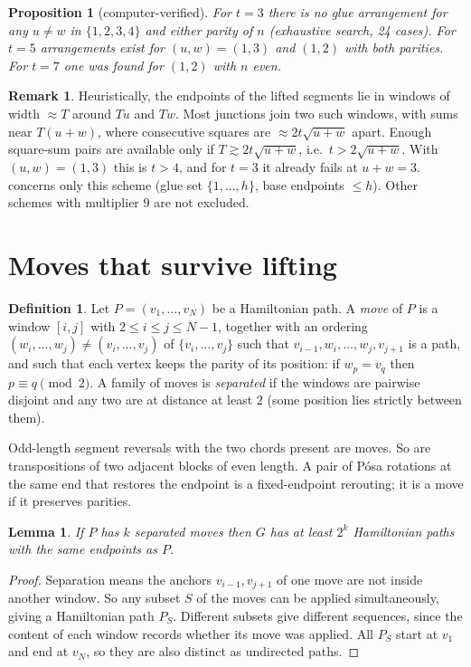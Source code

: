 \documentclass[11pt]{amsart}
\newtheorem{lemma}[theorem]{Lemma}
\newtheorem{proposition}[theorem]{Proposition}
\theoremstyle{definition}
\newtheorem{definition}[theorem]{Definition}
\newtheorem{remark}[theorem]{Remark}
\begin{document}
\begin{proposition}[computer-verified]\label{prop:t3}
For $t=3$ there is no glue arrangement for any $u\ne w$ in $\{1,2,3,4\}$ and either
parity of $n$ (exhaustive search, 24 cases). For $t=5$ arrangements exist for
$(u,w)=(1,3)$ and $(1,2)$ with both parities. For $t=7$ one was found for $(1,2)$
with $n$ even.
\end{proposition}

\begin{remark}\label{rem:threshold}
Heuristically, the endpoints of the lifted segments lie in windows of width $\approx T$
around $Tu$ and $Tw$. Most junctions join two such windows, with sums near $T(u+w)$, where
consecutive squares are $\approx 2t\sqrt{u+w}$ apart. Enough square-sum pairs are
available only if $T\gtrsim 2t\sqrt{u+w}$, i.e.\ $t>2\sqrt{u+w}$. With $(u,w)=(1,3)$ this
is $t>4$, and for $t=3$ it already fails at $u+w=3$.  concerns only this
scheme (glue set $\{1,\dots,h\}$, base endpoints $\le h$). Other schemes with
multiplier $9$ are not excluded.
\end{remark}

\section{Moves that survive lifting}\label{sec:moves}

\begin{definition}\label{def:move}
Let $P=(v_1,\dots,v_N)$ be a Hamiltonian path. A \emph{move} of $P$ is a window
$[i,j]$ with $2\le i\le j\le N-1$, together with an ordering
$(w_i,\dots,w_j)\ne(v_i,\dots,v_j)$ of $\{v_i,\dots,v_j\}$ such that
$v_{i-1},w_i,\dots,w_j,v_{j+1}$ is a path, and such that each vertex keeps the
parity of its position: if $w_p=v_q$ then $p\equiv q\pmod 2$. A family of moves is
\emph{separated} if the windows are pairwise disjoint and any two are at
distance at least $2$ (some position lies strictly between them).
\end{definition}

Odd-length segment reversals with the two chords present are moves. So are
transpositions of two adjacent blocks of even length. A pair of P\'osa rotations
\cite{Posa} at the same end that restores the endpoint is a fixed-endpoint rerouting;
it is a move if it preserves parities.

\begin{lemma}\label{lem:2k}
If $P$ has $k$ separated moves then $G$ has at least $2^k$ Hamiltonian paths with the
same endpoints as $P$.
\end{lemma}
\begin{proof}
Separation means the anchors $v_{i-1},v_{j+1}$ of one move are not inside another
window. So any subset $S$ of the moves can be applied simultaneously, giving a
Hamiltonian path $P_S$. Different subsets give different sequences, since the content
of each window records whether its move was applied. All $P_S$ start at $v_1$ and end at
$v_N$, so they are also distinct as undirected paths.
\end{proof}
\end{document}
